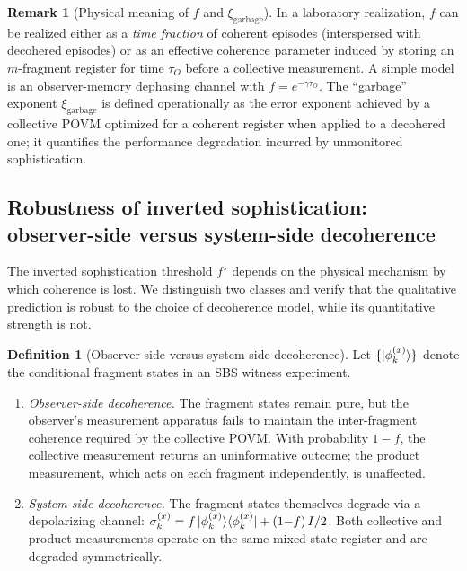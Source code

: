 \documentclass[11pt]{article}
\newcommand{\1}{\mathbf{1}}
\newcommand{\QCBdist}{\xi}
\theoremstyle{definition}
\newtheorem{definition}{Definition}
\newtheorem{remark}{Remark}
\theoremstyle{plain}
\begin{document}
\begin{remark}[Physical meaning of $f$ and $\QCBdist_{\mathrm{garbage}}$]
In a laboratory realization, $f$ can be realized either as a \emph{time fraction} of coherent episodes (interspersed with decohered episodes) or as an effective coherence parameter induced by storing an $m$-fragment register for time $\tau_O$ before a collective measurement.
A simple model is an observer-memory dephasing channel with $f=e^{-\gamma \tau_O}$.
The ``garbage'' exponent $\QCBdist_{\mathrm{garbage}}$ is defined operationally as the error exponent achieved by a collective POVM optimized for a coherent register when applied to a decohered one; it quantifies the performance degradation incurred by unmonitored sophistication.
\end{remark}

\subsection{Robustness of inverted sophistication: observer-side versus system-side decoherence}
\label{sec:robustness}

The inverted sophistication threshold $f^\star$ depends on the physical mechanism by which coherence is lost.  We distinguish two classes and verify that the qualitative prediction is robust to the choice of decoherence model, while its quantitative strength is not.

\begin{definition}[Observer-side versus system-side decoherence]
\label{def:decoherence-side}
Let $\{\ket{\phi_k^{(x)}}\}$ denote the conditional fragment states in an SBS witness experiment.
\begin{enumerate}[nosep,label=(\roman*)]
  \item \emph{Observer-side decoherence.}
    The fragment states remain pure, but the observer's measurement apparatus
    fails to maintain the inter-fragment coherence required by the collective
    POVM.  With probability $1{-}f$, the collective measurement returns an
    uninformative outcome; the product measurement, which acts on each
    fragment independently, is unaffected.
  \item \emph{System-side decoherence.}
    The fragment states themselves degrade via a depolarizing channel:
    $\sigma_k^{(x)} = f\ket{\phi_k^{(x)}}\!\bra{\phi_k^{(x)}}
    + (1{-}f)\,I/2$.
    Both collective and product measurements operate on the same mixed-state
    register and are degraded symmetrically.
\end{enumerate}
\end{definition}
\end{document}
